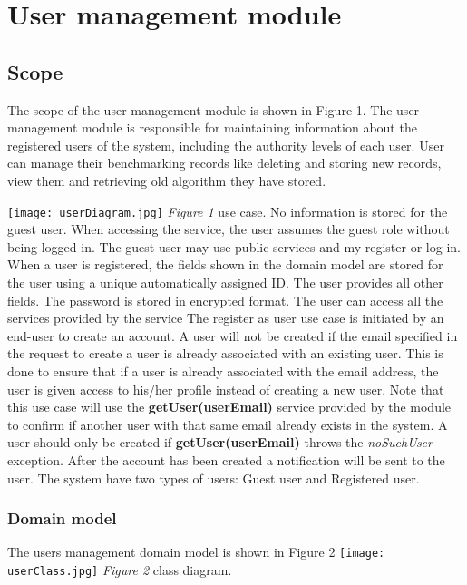 \documentclass[runningheads,a4paper]{article}
\begin{document}
\section{User management module}
\subsection{Scope}
The scope of the user management module is shown in Figure 1. The user
management module is responsible for maintaining information about the registered
users of the system, including the authority levels of each user. User can manage their benchmarking records like deleting and storing new records, view them and retrieving old algorithm they have stored.

\texttt{[image: userDiagram.jpg]}
\newline 
\textit{Figure 1} use case.
\newline
\newline No information is stored for the guest user. When accessing the service, the user
assumes the guest role without being logged in. The guest user may use public
services and my register or log in.
When a user is registered, the fields shown in the domain model are stored for the
user using a unique automatically assigned ID. The user provides all other fields. The
password is stored in encrypted format. The user can access all the services provided by the service
The register as user  use case is initiated by an end-user to create an account.\newline\newline
A user will not be created if the email specified in the request to create a user is already
associated with an existing user. This is done to ensure that if a user is already associated
with the email address, the user is given access to his/her profile instead of creating a new
user.\newline\newline
Note that this use case will use the \textbf{getUser(userEmail)} service provided by the module to
confirm if another user with that same email already exists in the system. A user should
only be created if \textbf{getUser(userEmail)} throws the \textit{noSuchUser} exception.
After the account has been created a notification will be sent to the user. The system have two types of users: Guest user and Registered user.
\subsubsection{\textbf{Domain model}}
The users management domain model is shown in Figure 2
\newline
\newline
\texttt{[image: userClass.jpg]}
\newline 
\textit{Figure 2} class diagram.
\end{document}
